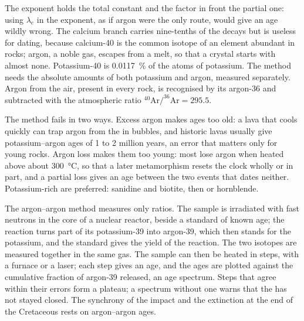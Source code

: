 The exponent holds the total constant and the factor in front the partial one:
using $\lambda_e$ in the exponent, as if argon were the only route, would give
an age wildly wrong. The calcium branch carries nine-tenths of the decays but is
useless for dating, because calcium-40 is the common isotope of an element
abundant in rocks; argon, a noble gas, escapes from a melt, so that a crystal
starts with almost none. Potassium-40 is \qty{0.0117}{\percent} of the atoms of
potassium. The method needs the absolute amounts of both potassium and argon,
measured separately. Argon from the air, present in every rock, is recognised by
its argon-36 and subtracted with the atmospheric ratio
$^{40}\mathrm{Ar}/^{36}\mathrm{Ar} = 295.5$.

The method fails in two ways. Excess argon makes ages too old: a lava that
cools quickly can trap argon from the  in bubbles, and historic lavas
usually give potassium--argon ages of 1 to 2 million years, an error that
matters only for young rocks. Argon loss makes them too young: most 
lose argon when heated above about \qty{300}{\celsius}, so that a later
metamorphism resets the clock wholly or in part, and a partial loss gives an age
between the two events that dates neither. Potassium-rich  are
preferred: sanidine and biotite, then  or hornblende.

The argon--argon method measures only ratios. The sample is irradiated with
fast neutrons in the core of a nuclear reactor, beside a standard  of
known age; the reaction turns part of its potassium-39 into argon-39, which then
stands for the potassium, and the standard gives the yield of the reaction. The
two isotopes are measured together in the same gas. The sample can then be
heated in steps, with a furnace or a laser; each step gives an age, and the
ages are plotted against the cumulative fraction of argon-39 released, an age
spectrum. Steps that agree within their errors form a plateau; a spectrum
without one warns that the  has not stayed closed. The synchrony of the
impact and the extinction at the end of the Cretaceous rests on argon--argon
ages.

